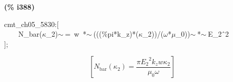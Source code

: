 \documentclass[fleqn]{article}
\begin{document}
\noindent
\begin{minipage}[t]{4.000000em}\color{red}\bfseries
(\% i388)	
\end{minipage}
\begin{minipage}[t]{\textwidth}\color{blue}
cmt\_ch05\_5830:[\\
\ \ \ \ N\_bar(\ensuremath{\kappa}\_2)\ensuremath{\sim\ }=\ w\ *\ensuremath{\sim\ }(((\%pi*k\_z)*(\ensuremath{\kappa}\_2))/(\ensuremath{\omega}*\ensuremath{\mu}\_0))\ensuremath{\sim\ }*\ensuremath{\sim\ }E\_2\^\ 2\\
];
\end{minipage}
\[\displaystyle \tag{\% o388} 
\left[ {N_{\ensuremath{\mathrm{bar}}}}\left( {{\kappa }_2}\right) =\frac{\ensuremath{\pi}  {{{E_2}}^{2}} {k_z} w {{\kappa }_2}}{{{\mu }_0} \omega }\right] \mbox{}
\]
\end{document}
